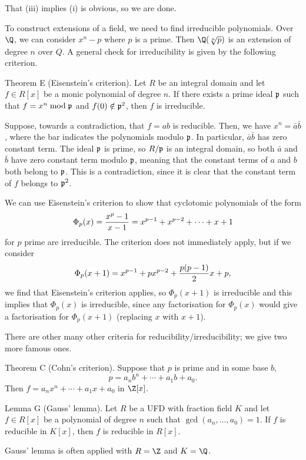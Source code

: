 That (iii) implies (i) is obvious, so we are done.\slug

To construct extensions of a field, we need to find irreducible polynomials. Over $\Q$, we can consider $x^n - p$ where $p$ is a prime. Then $\Q(\root n\of p)$ is an extension of degree $n$ over $Q$. A general check for irreducibility is given by the following criterion.

\parenproclaim Theorem E (Eisenstein's criterion). Let $R$ be an integral domain and let $f\in R[x]$ be a monic polynomial of degree $n$. If there exists a prime ideal $\frak p$ such that $f = x^n \bmod \frak p$ and $f(0) \notin \frak p^2$, then $f$ is irreducible.

\proof Suppose, towards a contradiction, that $f = ab$ is reducible. Then, we have $x^n = \bar a \bar b$, where the bar indicates the polynomials modulo $\frak p$. In particular, $\bar a\bar b$ has zero constant term. The ideal $\frak p$ is prime, so $R/\frak p$ is an integral domain, so both $\bar a$ and $\bar b$ have zero constant term modulo $\frak p$, meaning that the constant terms of $a$ and $b$ both belong to $\frak p$. This is a contradiction, since it is clear that the constant term of $f$ belongs to $\frak p^2$.\slug

We can use Eisenstein's criterion to show that cyclotomic polynomials of the form
$$\Phi_p(x) = {x^p -1\over x-1} = x^{p-1} + x^{p-2} + \cdots + x + 1$$
for $p$ prime are irreducible. The criterion does not immediately apply, but if we consider
$$\Phi_p(x+1) = x^{p-1} + px^{p-2} + {p(p-1)\over 2}x + p,$$
we find that Eisenstein's criterion applies, so $\Phi_p(x+1)$ is irreducible and this implies that $\Phi_p(x)$ is irreducible, since any factorisation for $\Phi_p(x)$ would give a factorisation for $\Phi_p(x+1)$ (replacing $x$ with $x+1$).

There are other many other criteria for reducibility/irreducibility; we give two more famous ones.

\parenproclaim Theorem C (Cohn's criterion). Suppose that $p$ is prime and in some base $b$,
$$p = a_nb^n + \cdots + a_1b + a_0.$$
Then $f = a_nx^n + \cdots + a_1x + a_0$ in $\Z[x]$.\slug

\parenproclaim Lemma G (Gauss' lemma). Let $R$ be a UFD with fraction field $K$ and let $f\in R[x]$ be a polynomial of degree $n$ such that $\gcd(a_n, \ldots, a_0) = 1$. If $f$ is reducible in $K[x]$, then $f$ is reducible in $R[x]$.\slug

Gauss' lemma is often applied with $R = \Z$ and $K = \Q$.

